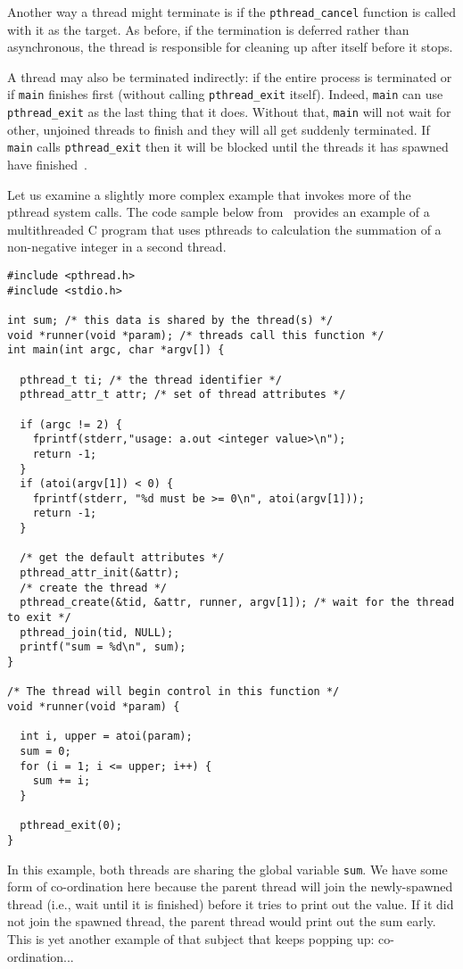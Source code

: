 Another way a thread might terminate is if the \texttt{pthread\_cancel} function is called with it as the target. As before, if the termination is deferred rather than asynchronous, the thread is responsible for cleaning up after itself before it stops.

A thread may also be terminated indirectly: if the entire process is terminated or if \texttt{main} finishes first (without calling \texttt{pthread\_exit} itself). Indeed, \texttt{main} can use \texttt{pthread\_exit} as the last thing that it does. Without that, \texttt{main} will not wait for other, unjoined threads to finish and they will all get suddenly terminated. If \texttt{main} calls \texttt{pthread\_exit} then it will be blocked until the threads it has spawned have finished~\cite{pthreads}.



Let us examine a slightly more complex example that invokes more of the pthread system calls. The code sample below from~\cite{osc} provides an example of a multithreaded C program that uses pthreads to calculation the summation of a non-negative integer in a second thread. 

\begin{verbatim}
#include <pthread.h>
#include <stdio.h>

int sum; /* this data is shared by the thread(s) */
void *runner(void *param); /* threads call this function */
int main(int argc, char *argv[]) {

  pthread_t ti; /* the thread identifier */
  pthread_attr_t attr; /* set of thread attributes */

  if (argc != 2) {
    fprintf(stderr,"usage: a.out <integer value>\n"); 
    return -1;
  }
  if (atoi(argv[1]) < 0) {
    fprintf(stderr, "%d must be >= 0\n", atoi(argv[1])); 
    return -1;
  }

  /* get the default attributes */
  pthread_attr_init(&attr);
  /* create the thread */
  pthread_create(&tid, &attr, runner, argv[1]); /* wait for the thread to exit */
  pthread_join(tid, NULL); 
  printf("sum = %d\n", sum);
}

/* The thread will begin control in this function */ 
void *runner(void *param) {

  int i, upper = atoi(param);
  sum = 0;
  for (i = 1; i <= upper; i++) {
    sum += i;
  }
  
  pthread_exit(0);
}
\end{verbatim}

In this example, both threads are sharing the global variable \texttt{sum}. We have some form of co-ordination here because the parent thread will join the newly-spawned thread (i.e., wait until it is finished) before it tries to print out the value. If it did not join the spawned thread, the parent thread would print out the sum early. This is yet another example of that subject that keeps popping up: co-ordination...



